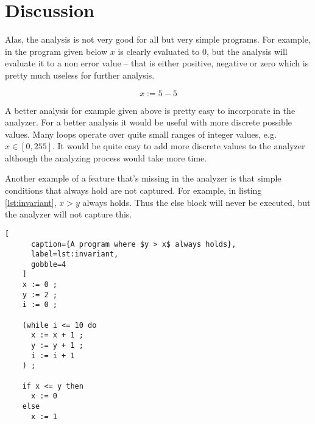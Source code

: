 \documentclass[11pt,oneside,a4paper]{article}
\begin{document}
      

\section*{Discussion}
  Alas, the analysis is not very good for all but very simple programs. For
  example, in the program given below $x$ is clearly evaluated to $0$, but the
  analysis will evaluate it to a non error value -- that is either positive,
  negative or zero which is pretty much useless for further analysis.

  \[
    x := 5-5
  \]

  A better analysis for example given above is pretty easy to incorporate in
  the analyzer. For a better analysis it would be useful with more discrete
  possible values. Many loops operate over quite small ranges of integer
  values, e.g.\ $x \in [0,255]$. It would be quite easy to add more discrete
  values to the analyzer although the analyzing process would take more time.

  Another example of a feature that's missing in the analyzer is that simple
  conditions that always hold are not captured. For example, in listing
  \ref{lst:invariant}, $x > y$ always holds. Thus the else block will never be
  executed, but the analyzer will not capture this.

  \begin{lstlisting}[
      caption={A program where $y > x$ always holds},
      label=lst:invariant,
      gobble=4
    ]
    x := 0 ;
    y := 2 ;
    i := 0 ;

    (while i <= 10 do
      x := x + 1 ;
      y := y + 1 ;
      i := i + 1
    ) ;

    if x <= y then
      x := 0
    else
      x := 1
  \end{lstlisting}
\end{document}
